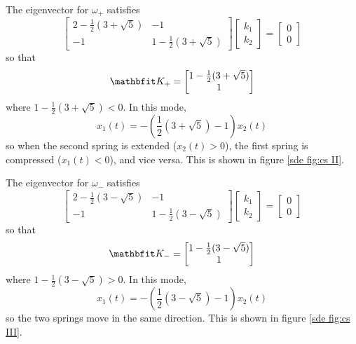 \begin{example}
The eigenvector for $\omega_{+}$ satisfies
$$\begin{bmatrix} 2-\frac{1}{2}(3+\sqrt{5})&-1\\-1&1-\frac{1}{2}
(3+\sqrt{5})\end{bmatrix}
\begin{bmatrix} k_1\\k_2\end{bmatrix}=
\begin{bmatrix} 0\\0\end{bmatrix}$$
so that
$$\vect{K}_{+}=\begin{bmatrix} 1-\frac{1}{2}(3+\sqrt{5})\\1\end{bmatrix}$$
where $1-\frac{1}{2}(3+\sqrt{5})<0$.  In this mode,
$$x_1(t)=-\left(\frac{1}{2}(3+\sqrt{5})-1\right)x_2(t)$$
so when the second spring is extended ($x_2(t)>0$), the first spring is
compressed ($x_1(t)<0$), and vice versa.  This is shown in figure
\ref{sde fig:cs II}.


The eigenvector for $\omega_{-}$ satisfies
$$\begin{bmatrix} 2-\frac{1}{2}(3-\sqrt{5})&-1\\-1&1-\frac{1}{2}
(3-\sqrt{5})\end{bmatrix}
\begin{bmatrix} k_1\\k_2\end{bmatrix}=
\begin{bmatrix} 0\\0\end{bmatrix}$$
so that
$$\vect{K}_{-}=\begin{bmatrix} 1-\frac{1}{2}(3-\sqrt{5})\\1\end{bmatrix}$$
where $1-\frac{1}{2}(3-\sqrt{5})>0$.  In this mode,
$$x_1(t)=-\left(\frac{1}{2}(3-\sqrt{5})-1\right)x_2(t)$$
so the two springs move in the same direction.  This is shown in figure
\ref{sde fig:cs III}.
\end{example}

